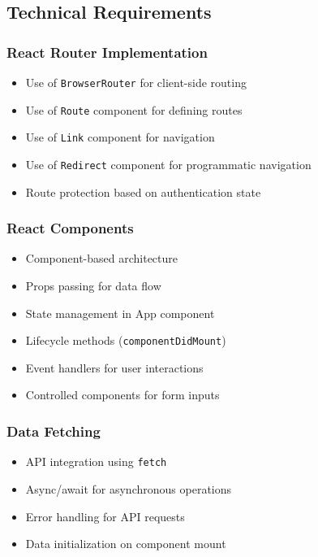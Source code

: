 \documentclass[11pt,a4paper]{article}
\begin{document}
\subsection{Technical Requirements}

\subsubsection{React Router Implementation}
\begin{itemize}[leftmargin=*]
    \item Use of \texttt{BrowserRouter} for client-side routing
    \item Use of \texttt{Route} component for defining routes
    \item Use of \texttt{Link} component for navigation
    \item Use of \texttt{Redirect} component for programmatic navigation
    \item Route protection based on authentication state
\end{itemize}

\subsubsection{React Components}
\begin{itemize}[leftmargin=*]
    \item Component-based architecture
    \item Props passing for data flow
    \item State management in App component
    \item Lifecycle methods (\texttt{componentDidMount})
    \item Event handlers for user interactions
    \item Controlled components for form inputs
\end{itemize}

\subsubsection{Data Fetching}
\begin{itemize}[leftmargin=*]
    \item API integration using \texttt{fetch}
    \item Async/await for asynchronous operations
    \item Error handling for API requests
    \item Data initialization on component mount
\end{itemize}
\end{document}
